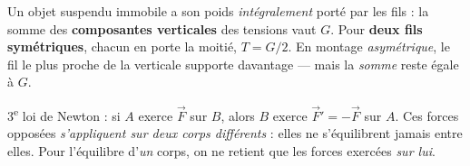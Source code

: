 \documentclass[11pt,a4paper]{article}
\newcommand{\vv}[1]{\vec{#1}}\newcommand{\ds}{\displaystyle}
\begin{document}
\begin{cle}
Un objet suspendu immobile a son poids \emph{intégralement} porté par les fils : la somme des
\textbf{composantes verticales} des tensions vaut $G$. Pour \textbf{deux fils symétriques}, chacun en
porte la moitié, $T=G/2$. En montage \emph{asymétrique}, le fil le plus proche de la verticale
supporte davantage — mais la \emph{somme} reste égale à $G$.
\end{cle}

\begin{piege}
3\textsuperscript{e} loi de Newton : si $A$ exerce $\vv F$ sur $B$, alors $B$ exerce $\vv F'=-\vv F$ sur
$A$. Ces forces opposées \emph{s'appliquent sur deux corps différents} : elles ne s'équilibrent jamais
entre elles. Pour l'équilibre d'\emph{un} corps, on ne retient que les forces exercées \emph{sur lui}.
\end{piege}
\end{document}
